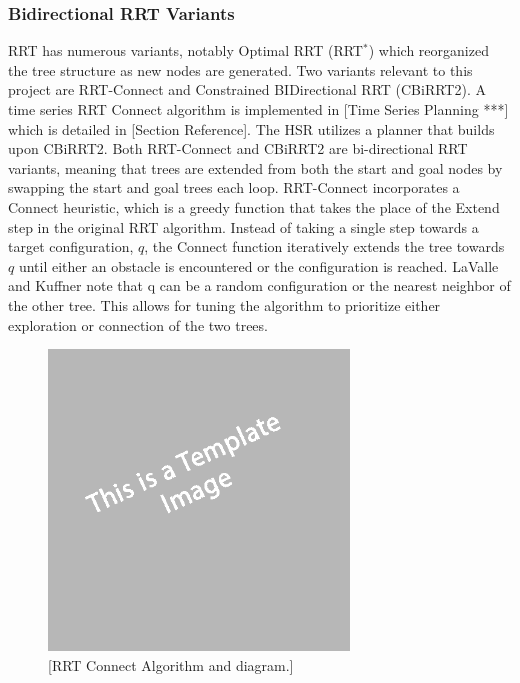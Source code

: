\documentclass[12pt]{article}
\begin{document}
        \subsubsection{Bidirectional RRT Variants}
            RRT has numerous variants, notably Optimal RRT (RRT\(^*\)) which reorganized the tree structure as new nodes are generated. Two variants relevant to this project are RRT-Connect and Constrained BIDirectional RRT (CBiRRT2). A time series RRT Connect algorithm is implemented in [Time Series Planning ***] which is detailed in [Section Reference]. The HSR utilizes a planner that builds upon CBiRRT2. Both RRT-Connect and CBiRRT2 are bi-directional RRT variants, meaning that trees are extended from both the start and goal nodes by swapping the start and goal trees each loop. RRT-Connect incorporates a Connect heuristic, which is a greedy function that takes the place of the Extend step in the original RRT algorithm. Instead of taking a single step towards a target configuration, \(q\), the Connect function iteratively extends the tree towards \(q\) until either an obstacle is encountered or the configuration is reached. LaValle and Kuffner note that q can be a random configuration or the nearest neighbor of the other tree. This allows for tuning the algorithm to prioritize either exploration or connection of the two trees.
            \begin{figure}[ht][ht]
                \includegraphics[width=8cm]{temp}
                \centering
                \caption{[RRT Connect Algorithm and diagram.]}
            \end{figure}
\end{document}
